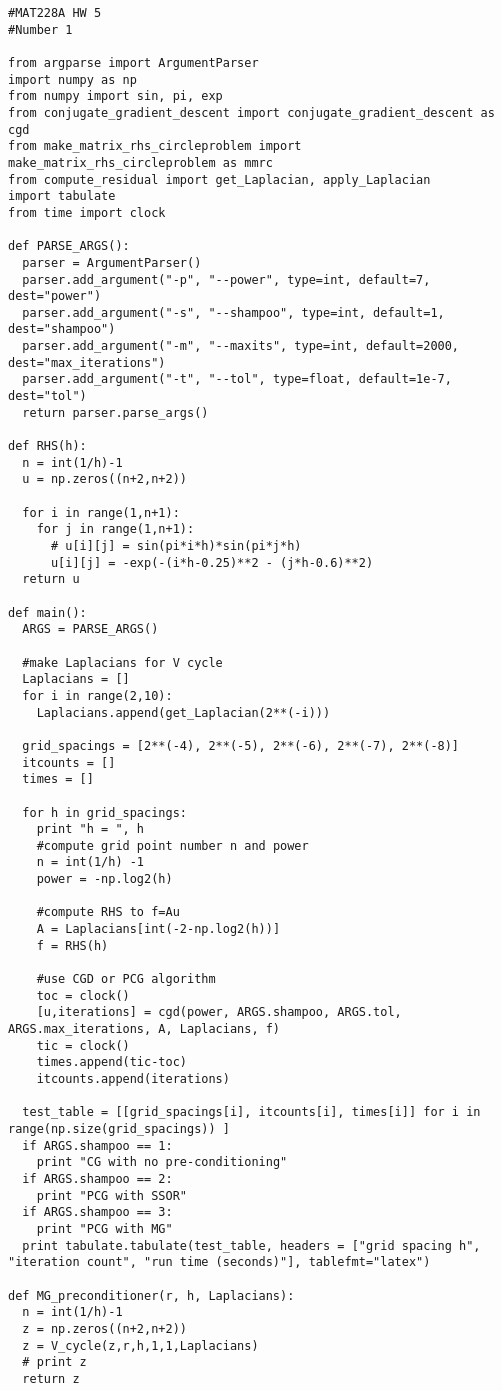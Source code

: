 \documentclass[12pt]{article}
\begin{document}
\begin{verbatim}
#MAT228A HW 5
#Number 1

from argparse import ArgumentParser
import numpy as np
from numpy import sin, pi, exp
from conjugate_gradient_descent import conjugate_gradient_descent as cgd
from make_matrix_rhs_circleproblem import make_matrix_rhs_circleproblem as mmrc
from compute_residual import get_Laplacian, apply_Laplacian
import tabulate
from time import clock

def PARSE_ARGS():
  parser = ArgumentParser()
  parser.add_argument("-p", "--power", type=int, default=7, dest="power")
  parser.add_argument("-s", "--shampoo", type=int, default=1, dest="shampoo")
  parser.add_argument("-m", "--maxits", type=int, default=2000, dest="max_iterations")
  parser.add_argument("-t", "--tol", type=float, default=1e-7, dest="tol")
  return parser.parse_args()  

def RHS(h):
  n = int(1/h)-1
  u = np.zeros((n+2,n+2))

  for i in range(1,n+1):
    for j in range(1,n+1):
      # u[i][j] = sin(pi*i*h)*sin(pi*j*h)
      u[i][j] = -exp(-(i*h-0.25)**2 - (j*h-0.6)**2)
  return u

def main():
  ARGS = PARSE_ARGS()

  #make Laplacians for V cycle
  Laplacians = []
  for i in range(2,10):
    Laplacians.append(get_Laplacian(2**(-i)))

  grid_spacings = [2**(-4), 2**(-5), 2**(-6), 2**(-7), 2**(-8)]
  itcounts = []
  times = [] 
  
  for h in grid_spacings:
    print "h = ", h
    #compute grid point number n and power
    n = int(1/h) -1
    power = -np.log2(h)

    #compute RHS to f=Au
    A = Laplacians[int(-2-np.log2(h))]
    f = RHS(h)
    
    #use CGD or PCG algorithm
    toc = clock()
    [u,iterations] = cgd(power, ARGS.shampoo, ARGS.tol, ARGS.max_iterations, A, Laplacians, f)
    tic = clock()
    times.append(tic-toc)
    itcounts.append(iterations)

  test_table = [[grid_spacings[i], itcounts[i], times[i]] for i in range(np.size(grid_spacings)) ]
  if ARGS.shampoo == 1:
    print "CG with no pre-conditioning"
  if ARGS.shampoo == 2:
    print "PCG with SSOR"
  if ARGS.shampoo == 3:
    print "PCG with MG" 
  print tabulate.tabulate(test_table, headers = ["grid spacing h", "iteration count", "run time (seconds)"], tablefmt="latex")

def MG_preconditioner(r, h, Laplacians):
  n = int(1/h)-1
  z = np.zeros((n+2,n+2))
  z = V_cycle(z,r,h,1,1,Laplacians)
  # print z
  return z


\end{verbatim}
\end{document}
